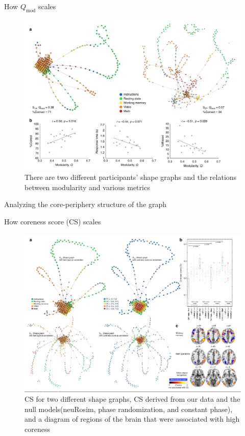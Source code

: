 \documentclass{beamer}
\begin{document}
\begin{frame}{How $Q_{\mathrm{mod}}$ scales}
    \begin{figure}
        \includegraphics[width = 0.75\linewidth]{fig3.png}
        \caption{There are two different participants' shape graphs and the relations between modularity and various metrics}
    \end{figure}
\end{frame}

\begin{frame}{Analyzing the core-periphery structure of the graph}
    
\end{frame}

\begin{frame}{How coreness score (CS) scales}
    \begin{figure}
        \includegraphics[width = 0.7\linewidth]{fig4.png}
        \caption{CS for two different shape graphs, CS derived from our data and the null models(neuRosim, phase randomization, and constant phase), and a diagram of regions of the brain that were associated with high coreness}
    \end{figure}
\end{frame}
\end{document}
